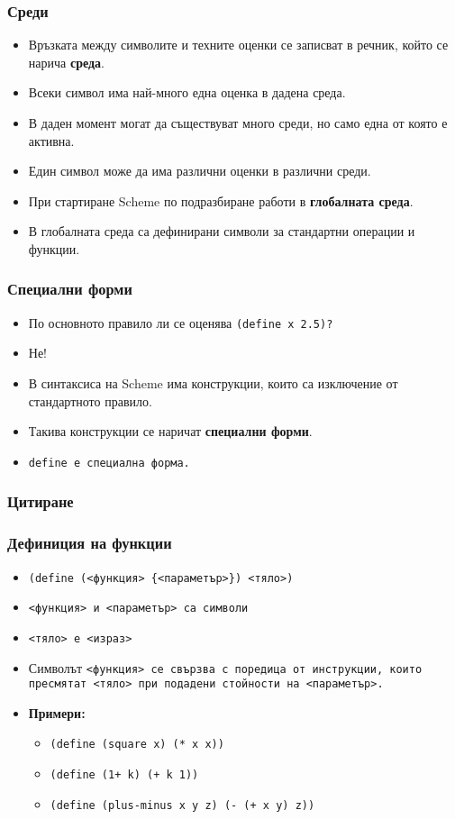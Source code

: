 \documentclass{beamer}
\begin{document}
\begin{frame}
  \frametitle{Среди}
  
  \begin{itemize}
  \item Връзката между символите и техните оценки се записват в речник, който се нарича \textbf{среда}.
  \item Всеки символ има най-много една оценка в дадена среда.
  \item В даден момент могат да съществуват много среди, но само една от която е активна.
  \item \alert{Един символ може да има различни оценки в различни среди.}
  \item При стартиране Scheme по подразбиране работи в \textbf{глобалната среда}.
  \item В глобалната среда са дефинирани символи за стандартни операции и функции.
  \end{itemize}
\end{frame}

\begin{frame}
  \frametitle{Специални форми}

  \begin{itemize}[<+->]
  \item По основното правило ли се оценява \tt{(define x 2.5)}?
  \item \alert{Не!}
  \item В синтаксиса на Scheme има конструкции, които са изключение от стандартното правило.
  \item Такива конструкции се наричат \textbf{специални форми}.
  \item \tt{define} е специална форма.
  \end{itemize}
\end{frame}

\begin{frame}
  \frametitle{Цитиране}
\end{frame}


\begin{frame}
  \frametitle{Дефиниция на функции}

  \begin{itemize}
  \item \tt{\alert{(define (}{}<функция> \{<параметър>\}\alert{)} <тяло>\alert{)}}
  \item \tt{<функция>} и \tt{<параметър>} са символи
  \item \tt{<тяло>} е \tt{<израз>}
  \item Символът \tt{<функция>} се свързва с поредица от инструкции, които пресмятат \tt{<тяло>} при подадени стойности на \tt{<параметър>}.
  \item \textbf{Примери:}
    \begin{itemize}
    \item \tt{(define (square x) (* x x))}
    \item \tt{(define (1+ k) (+ k 1))}
    \item \tt{(define (plus-minus x y z) (- (+ x y) z))}
    \end{itemize}
  \end{itemize}
\end{frame}
\end{document}
